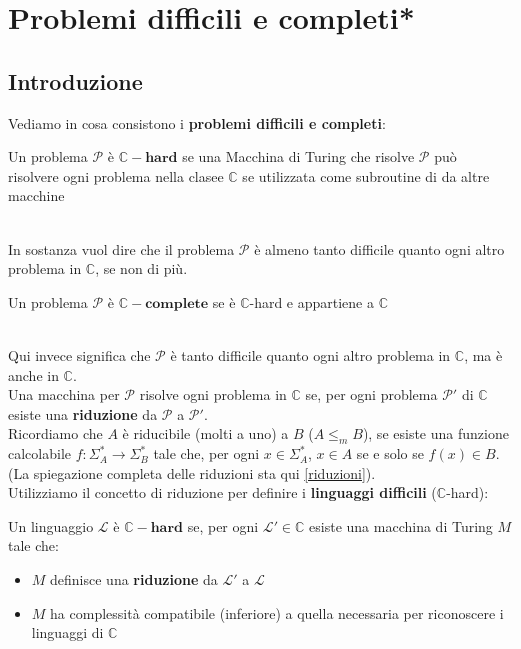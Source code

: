 \chapter{Problemi difficili e completi*}
\section{Introduzione}
Vediamo in cosa consistono i \textbf{problemi difficili e completi}:\smallskip\\
\colorbox{SALZO}{\parbox{\dimexpr\linewidth-2\fboxsep}{\begin{definition}
   Un problema $\mathcal{P}$ è $\bm{\mathbb{C}-\textbf{hard}}$ se una Macchina di Turing che risolve $\mathcal{P}$
   può risolvere ogni problema nella clasee $\mathbb{C}$ se utilizzata come subroutine di da altre macchine
\end{definition}}}\smallskip\\
In sostanza vuol dire che il problema $\mathcal{P}$ è almeno tanto difficile quanto ogni altro problema 
in $\mathbb{C}$, se non di più.\smallskip\\
\colorbox{SALZO}{\parbox{\dimexpr\linewidth-2\fboxsep}{\begin{definition}
   Un problema $\mathcal{P}$ è $\bm{\mathbf{\mathbb{C}}-\textbf{complete}}$ se è $\mathbb{C}$-hard e appartiene a $\mathbb{C}$
\end{definition}}}\smallskip\\
Qui invece significa che $\mathcal{P}$ è tanto difficile quanto ogni altro problema in $\mathbb{C}$, ma è anche in $\mathbb{C}$.\\
Una macchina per $\mathcal{P}$ risolve ogni problema in $\mathbb{C}$ se, per ogni problema $\mathcal{P'}$ di 
$\mathbb{C}$ esiste una \textbf{riduzione} da $\mathcal{P}$ a $\mathcal{P'}$.\\
Ricordiamo che $A$ è riducibile (molti a uno) a $B$ ($A \le_m B$), se esiste una funzione calcolabile 
$f:\Sigma_{A}^* \to \Sigma_B^*$ tale che, per ogni $x \in \Sigma_A^*$, $x \in A$ se e solo se $f(x) \in B$. 
(La spiegazione completa delle riduzioni sta qui \ref{riduzioni}).\smallskip\\
Utilizziamo il concetto di riduzione per definire i \textbf{linguaggi difficili} ($\mathbb{C}$-hard):\smallskip\\
\colorbox{SALZO}{\parbox{\dimexpr\linewidth-2\fboxsep}{\begin{definition}
    Un linguaggio $\mathcal{L}$ è $\bm{\mathbb{C}-\textbf{hard}}$ se, per ogni $\mathcal{L}' \in \mathbb{C}$ 
    esiste una macchina di Turing $M$ tale che:
    \begin{itemize}[label = --]
        \item $M$ definisce una \textbf{riduzione} da $\mathcal{L}'$ a $\mathcal{L}$
        \item $M$ ha complessità compatibile (inferiore) a quella necessaria per riconoscere i linguaggi di $\mathbb{C}$
    \end{itemize}
\end{definition}}}\smallskip\\


